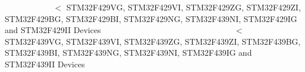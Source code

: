~\newline
~\newline
~\newline
~\newline
~\newline
~\newline
~\newline
 $<$ S\+T\+M32\+F429\+VG, S\+T\+M32\+F429\+VI, S\+T\+M32\+F429\+ZG, S\+T\+M32\+F429\+ZI, S\+T\+M32\+F429\+BG, S\+T\+M32\+F429\+BI, S\+T\+M32\+F429\+NG, S\+T\+M32\+F439\+NI, S\+T\+M32\+F429\+IG and S\+T\+M32\+F429\+II Devices ~\newline
~\newline
~\newline
~\newline
~\newline
~\newline
~\newline
~\newline
~\newline
~\newline
~\newline
~\newline
~\newline
~\newline
~\newline
~\newline
~\newline
~\newline
~\newline
 $<$ S\+T\+M32\+F439\+VG, S\+T\+M32\+F439\+VI, S\+T\+M32\+F439\+ZG, S\+T\+M32\+F439\+ZI, S\+T\+M32\+F439\+BG, S\+T\+M32\+F439\+BI, S\+T\+M32\+F439\+NG, S\+T\+M32\+F439\+NI, S\+T\+M32\+F439\+IG and S\+T\+M32\+F439\+II Devices ~\newline
~\newline
~\newline
~\newline
~\newline
~\newline
~\newline
~\newline
~\newline
~\newline
~\newline
~\newline
~\newline
~\newline
~\newline
~\newline
~\newline
